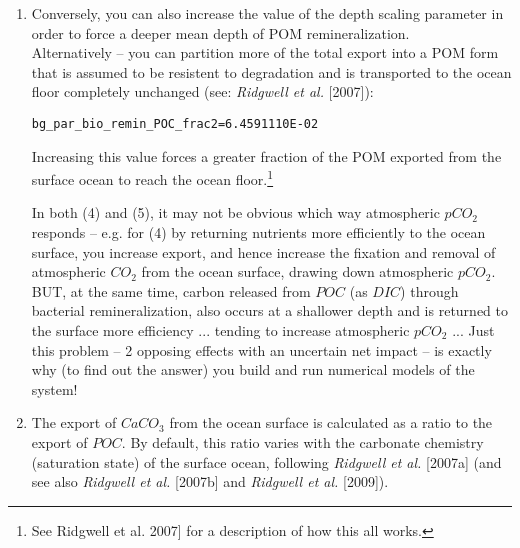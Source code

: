 \begin{enumerate}[noitemsep]
\vspace{1mm}
\item Conversely, you can also increase the value of the depth scaling parameter in order to force a deeper mean depth of POM remineralization. 
\\Alternatively -- you can partition more of the total export into a POM form that is assumed to be resistent to degradation and is transported to the ocean floor completely unchanged (see: \textit{Ridgwell et al.} [2007]):
\vspace{-1pt}\small\begin{verbatim}
bg_par_bio_remin_POC_frac2=6.4591110E-02
\end{verbatim}\normalsize\vspace{-1pt}
Increasing this value forces a greater fraction of the POM exported from the surface ocean to reach the ocean floor.\footnote{See Ridgwell et al. 2007] for a description of how this all works.}

\vspace{1mm}
In both (4) and (5), it may not be obvious which way atmospheric \(pCO_{2}\) responds -- e.g. for (4) by returning nutrients more efficiently to the ocean surface, you increase export, and hence increase the fixation and removal of atmospheric \(CO_{2}\) from the ocean surface, drawing down atmospheric \(pCO_{2}\). BUT, at the same time, carbon released from \(POC\) (as \(DIC\)) through bacterial remineralization, also occurs at a shallower depth and is returned to the surface more efficiency ... tending to increase atmospheric \(pCO_{2}\) ... Just this problem -- 2 opposing effects with an uncertain net impact -- is exactly why (to find out the answer) you build and run numerical models of the system!

\vspace{1mm}
\item The export of \(CaCO_{3}\) from the ocean surface is calculated as a ratio to the export of \(POC\). By default, this ratio varies with the carbonate chemistry (saturation state) of the surface ocean, following \textit{Ridgwell et al.} [2007a] (and see also \textit{Ridgwell et al.} [2007b] and \textit{Ridgwell et al.} [2009]). 


\end{enumerate}
